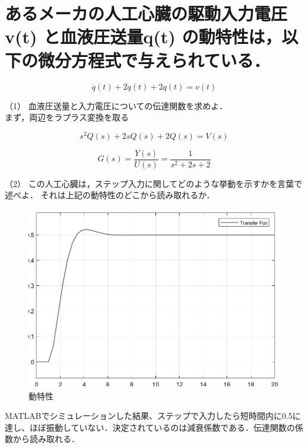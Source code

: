 \documentclass[xelatex,ja=standard,jafont=noto]{bxjsarticle}
\begin{document}
\section{あるメーカの人工心臓の駆動入力電圧v(t) と血液圧送量q(t) の動特性は，以下の微分方程式で与えられている．}
	
		\begin{equation}
	\ddot{q}(t)+2\dot{q}(t)+2q(t)=v(t)
	\end{equation}
	
	（1） 血液圧送量と入力電圧についての伝達関数を求めよ．\\
	
	まず，両辺をラプラス変換を取る
	
		\begin{equation}
s^{2}Q(s)+2sQ(s)+2Q(s)=V(s)
	\end{equation}
	
	\begin{equation}
	G(s)=\frac{Y(s)}{U(s)}=\frac{1}{s^{2}+2s+2}
\end{equation}


（2） この人工心臓は，ステップ入力に関してどのような挙動を示すかを言葉で述べよ．
それは上記の動特性のどこから読み取れるか．\\

\begin{figure}[h!]
    \centering
    \includegraphics[scale=0.4]{function.png}
    \caption{動特性 }
\end{figure}

MATLABでシミュレーションした結果、ステップで入力したら短時間内に0.5に達し、ほぼ振動していない．決定されているのは減衰係数である．伝達関数の係数から読み取れる．\\
\end{document}
